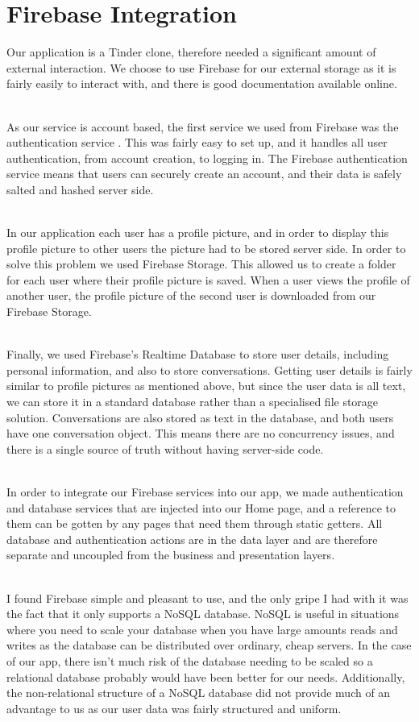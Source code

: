 \documentclass[a4paper, 11pt]{article}
\begin{document}
\section{Firebase Integration}
Our application is a Tinder clone, therefore needed a significant amount of external interaction. We choose to use Firebase for our external storage as it is fairly easily to interact with, and there is good documentation available online. 

~\\
As our service is account based, the first service we used from Firebase was the authentication service \cite{FirebaseAuth}. This was fairly easy to set up, and it handles all user authentication, from account creation, to logging in. The Firebase authentication service means that users can securely create an account, and their data is safely salted and hashed server side.

~\\
In our application each user has a profile picture, and in order to display this profile picture to other users the picture had to be stored server side. In order to solve this problem we used Firebase Storage. This allowed us to create a folder for each user where their profile picture is saved. When a user views the profile of another user, the profile picture of the second user is downloaded from our Firebase Storage.

~\\
Finally, we used Firebase's Realtime Database \cite{firebaseDB} to store user details, including personal information, and also to store conversations. Getting user details is fairly similar to profile pictures as mentioned above, but since the user data is all text, we can store it in a standard database rather than a specialised file storage solution. Conversations are also stored as text in the database, and both users have one conversation object. This means there are no concurrency issues, and there is a single source of truth without having server-side code.

~\\
In order to integrate our Firebase services into our app, we made authentication and database services that are injected into our Home page, and a reference to them can be gotten by any pages that need them through static getters. All database and authentication actions are in the data layer and are therefore separate and uncoupled from the business and presentation layers.

~\\
I found Firebase simple and pleasant to use, and the only gripe I had with it was the fact that it only supports a NoSQL database. NoSQL is useful in situations where you need to scale your database when you have large amounts reads and writes as the database can be distributed over ordinary, cheap servers. In the case of our app, there isn’t much risk of the database needing to be scaled so a relational database probably would have been better for our needs. Additionally, the non-relational structure of a NoSQL database did not provide much of an advantage to us as our user data was fairly structured and uniform.
\end{document}
